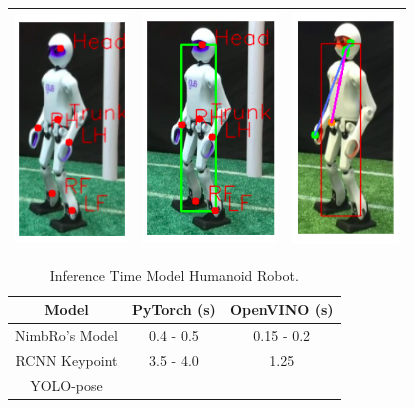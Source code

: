 \begin{longtable}{|c|c|c|}
  \includegraphics{gambar/nimbro-3.png} & \includegraphics{gambar/rcnn-3.png} & \includegraphics{gambar/yolo-3.png} \\
  \hline
\end{longtable}

\begin{longtable}{|c|c|c|}
  \caption{Inference Time Model Humanoid Robot.}
  \label{tb:inferencerobot}\\
  \hline
  \rowcolor[HTML]{C0C0C0}
  \textbf{Model}    & \textbf{PyTorch (s)} & \textbf{OpenVINO (s)}\\
  \hline
  NimbRo's Model & 0.4 - 0.5 & 0.15 - 0.2 \\
  \hline
  RCNN Keypoint   & 3.5 - 4.0 & 1.25 \\
  \hline
  YOLO-pose   &  &  \\
  \hline
\end{longtable}


